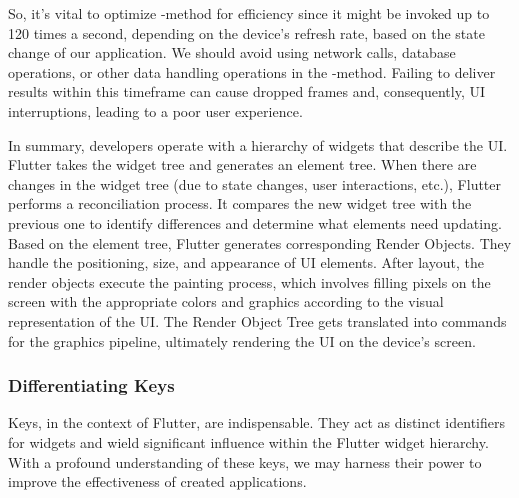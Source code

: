 So, it's vital to optimize -method for efficiency since it might be invoked up to 120 times a second, depending 
on the device's refresh rate, based on the state change of our application. We should avoid using network calls, 
database operations, or other data handling operations in the -method. Failing to deliver results within this 
timeframe can cause dropped frames and, consequently, UI interruptions, leading to a poor user experience.

In summary, developers operate with a hierarchy of widgets that describe the UI. Flutter takes the widget tree and 
generates an element tree. When there are changes in the widget tree (due to state changes, user interactions, etc.), 
Flutter performs a reconciliation process. It compares the new widget tree with the previous one to identify differences 
and determine what elements need updating. Based on the element tree, Flutter generates corresponding Render Objects.
They handle the positioning, size, and appearance of UI elements. After layout, the render objects execute the painting 
process, which involves filling pixels on the screen with the appropriate colors and graphics according to the visual 
representation of the UI. The Render Object Tree gets translated into commands for the graphics pipeline, ultimately 
rendering the UI on the device's screen.


\newpage
\subsubsection{Differentiating Keys}

Keys, in the context of Flutter, are indispensable. They act as distinct identifiers for widgets and wield significant 
influence within the Flutter widget hierarchy. With a profound understanding of these keys, we may harness their power 
to improve the effectiveness of created applications.

